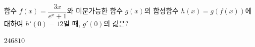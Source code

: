함수 $f(x)=\dfrac{3x}{e^x+1}$와 미분가능한 함수 $g(x)$의 합성함수 $h(x)=g(f(x))$에 대하여 $h'(0)=12$일 때, $g'(0)$의 값은?
\begin{choices32}{$2$}{$4$}{$6$}{$8$}{$10$}\end{choices32}

